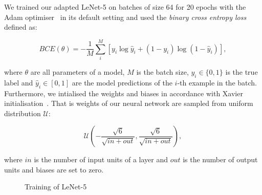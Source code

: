 We trained our adapted LeNet-5 on batches of size 64 for 20 epochs
with the Adam optimiser~\cite{kingma2014} in its default setting
and used the \textit{binary cross entropy loss} defined as:

\begin{equation}
	\mathit{BCE}(\theta) = -\frac{1}{M} \sum_i^M [y_i \log \hat{y}_i + (1 - y_i) \log(1 - \hat{y}_i)],
\end{equation}

where \(\theta\) are all parameters of a model,
\(M\) is the batch size,
\(y_i \in \{0, 1\}\) is the true label
and \(\hat{y}_i \in [0, 1]\) are the model predictions of the \(i\)-th example in the batch.
Furthermore, we intialised the weights and biases in accordance with Xavier initialisation~\cite{glorot2010}.
That is weights of our neural network are sampled from uniform distribution \(\mathcal{U}\):

\begin{equation}
	\mathcal{U}\left(
	-\frac{\sqrt{6}}{\sqrt{\mathit{in} + \mathit{out}}},
	\frac{\sqrt{6}}{\sqrt{\mathit{in} + \mathit{out}}}
	\right),
\end{equation}

where \(\mathit{in}\) is the number of input units of a layer
and \(\mathit{out}\) is the number of output units
and biases are set to zero.


\begin{figure}
\caption{Training of LeNet-5}
\label{lenet_losses}
\end{figure}

